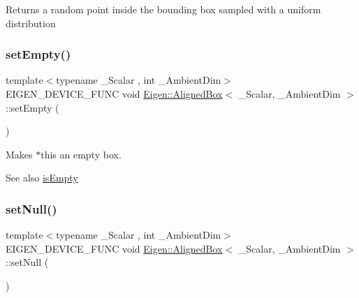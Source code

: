 \begin{DoxyReturn}{Returns}
a random point inside the bounding box sampled with a uniform distribution 
\end{DoxyReturn}
\mbox{\label{class_eigen_1_1_aligned_box_ae946a0964de83d4e688fa462fe6d6725}} 
\subsubsection{\texorpdfstring{setEmpty()}{setEmpty()}}
{\footnotesize\ttfamily template$<$typename \+\_\+\+Scalar , int \+\_\+\+Ambient\+Dim$>$ \\
E\+I\+G\+E\+N\+\_\+\+D\+E\+V\+I\+C\+E\+\_\+\+F\+U\+NC void \mbox{\hyperlink{class_eigen_1_1_aligned_box}{Eigen\+::\+Aligned\+Box}}$<$ \+\_\+\+Scalar, \+\_\+\+Ambient\+Dim $>$\+::set\+Empty (\begin{DoxyParamCaption}{ }\end{DoxyParamCaption})\hspace{0.3cm}{\ttfamily [inline]}}

Makes {\ttfamily $\ast$this} an empty box. \begin{DoxySeeAlso}{See also}
\mbox{\hyperlink{class_eigen_1_1_aligned_box_a0d194e2e56c3bef854e88ca2aba04c9e}{is\+Empty}} 
\end{DoxySeeAlso}
\mbox{\label{class_eigen_1_1_aligned_box_a1e0e312d7bd3468d7e15edb4f139fd13}} 
\subsubsection{\texorpdfstring{setNull()}{setNull()}}
{\footnotesize\ttfamily template$<$typename \+\_\+\+Scalar , int \+\_\+\+Ambient\+Dim$>$ \\
E\+I\+G\+E\+N\+\_\+\+D\+E\+V\+I\+C\+E\+\_\+\+F\+U\+NC void \mbox{\hyperlink{class_eigen_1_1_aligned_box}{Eigen\+::\+Aligned\+Box}}$<$ \+\_\+\+Scalar, \+\_\+\+Ambient\+Dim $>$\+::set\+Null (\begin{DoxyParamCaption}{ }\end{DoxyParamCaption})\hspace{0.3cm}{\ttfamily [inline]}}

